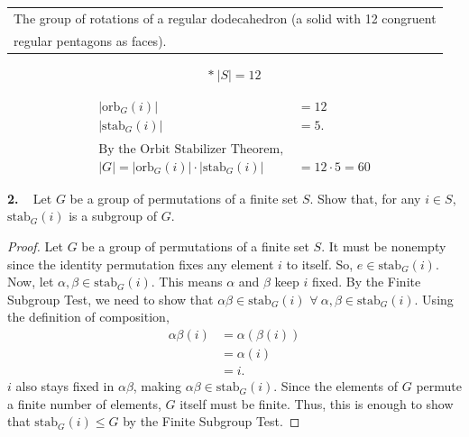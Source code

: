 \documentclass[12pt, letterpaper]{article}
\begin{document}
\qquad \quad {} \begin{tabular}[t]{l}
         The group of rotations of a regular dodecahedron (a solid with 12 congruent \\
         regular pentagons as faces).
    \end{tabular}
    \begin{align*}
        * \ |S| = 12
    \end{align*}
    \begin{center}
       \begin{align*}
        |\text{orb}_{G}(i)| &= 12 \\
        |\text{stab}_{G}(i)| &= 5. \\  \\
    \text{By the Orbit Stabilizer Theorem, } \\
    |G| = |\text{orb}_{G}(i)| \cdot |\text{stab}_{G}(i)| &= 12 \cdot 5 = \boxed{60}
\end{align*}
    \end{center}  \vspace{0.2em}
\textbf{2.} \  Let $G$ be a group of permutations of a finite set $S$. Show that, for any $i \in S$, $\text{stab}_{G}(i)$ is a subgroup of $G$.
\begin{proof}
    Let $G$ be a group of permutations of a finite set $S$. It must be nonempty since the identity permutation fixes any element $i$ to itself. So, $e \in \text{stab}_{G}(i)$. Now, let $\alpha, \beta \in \text{stab}_{G}(i)$. This means $\alpha$ and $\beta$ keep $i$ fixed. By the Finite Subgroup Test, we need to show that $\alpha\beta \in \text{stab}_{G}(i)$ $\forall \ \alpha,\beta\in \text{stab}_{G}(i)$. Using the definition of composition,
    \begin{align*}
        \alpha\beta(i) &= \alpha(\beta(i)) \\
        &= \alpha(i) \\
        &= i.
    \end{align*}
    $i$ also stays fixed in $\alpha\beta$, making $\alpha\beta \in \text{stab}_{G}(i)$. Since the elements of $G$ permute a finite number of elements, $G$ itself must be finite. Thus, this is enough to show that $\text{stab}_{G}(i) \leq G$ by the Finite Subgroup Test.
\end{proof}  \vspace{0.2em}
\end{document}
